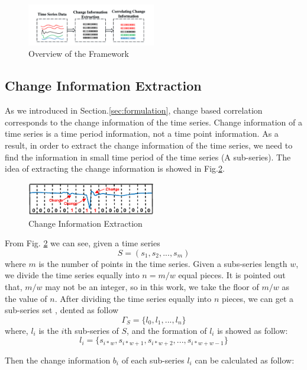 \begin{figure}[t]
\centering
\includegraphics[width=0.5\textwidth]{framework.pdf}
\caption{Overview of the Framework}
\label{fig:frame}
\end{figure}

\subsection{Change Information Extraction}
\label{ChangeCorrelation}

As we introduced in Section.\ref{sec:formulation}, change based correlation corresponds to the change information of the time series. 
Change information of a time series is a time period information, not a time point information. 
As a result, in order to extract the change information of the time series, we need to find the information in small time period of the time series (A sub-series). 
The idea of extracting the change information is showed in Fig.\ref{fig:ChangeMapping}.

\begin{figure}[t]
\centering
\includegraphics[width=0.5\textwidth]{changeExtraction.eps}
\caption{Change Information Extraction}
\label{fig:ChangeMapping}
\end{figure}

From Fig. \ref{fig:ChangeMapping} we can see, given a time series 
\[S = (s_1,s_2,...,s_m)\]
where $m$ is the number of points in the time series.
Given a subs-series length $w$, we divide the time series equally into $n = m/w$ equal pieces. It is pointed out that, $m/w$ may not be an integer, so in this work, we take the floor of $m/w$ as the value of $n$.
After dividing the time series equally into $n$ pieces, we can get a sub-series set , dented as follow
\[\Gamma_S = \{l_0,l_1,...,l_n\}\]
where, $l_i$ is the $i$th sub-series of $S$, and the formation of $l_i$ is showed as follow:
\[l_i = \{s_{i*w},s_{i*w+1},s_{i*w+2},...,s_{i*w+w-1}\}\]

Then the change information $b_i$ of each sub-series $l_i$ can be calculated as follow:


